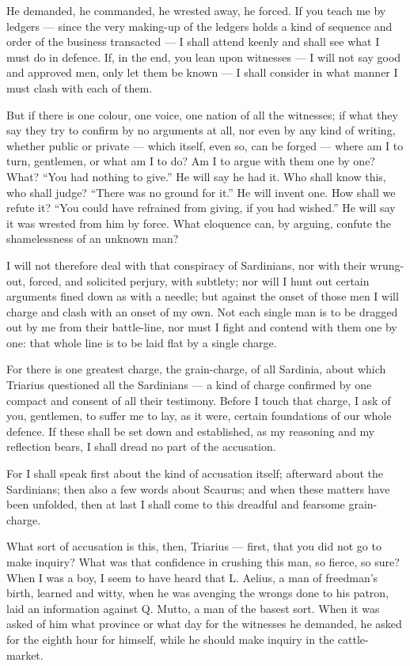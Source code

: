  He demanded, he commanded, he wrested away, he forced. If you teach me by ledgers --- since the very making-up of the ledgers holds a kind of sequence and order of the business transacted --- I shall attend keenly and shall see what I must do in defence. If, in the end, you lean upon witnesses --- I will not say good and approved men, only let them be known --- I shall consider in what manner I must clash with each of them.

 But if there is one colour, one voice, one nation of all the witnesses; if what they say they try to confirm by no arguments at all, nor even by any kind of writing, whether public or private --- which itself, even so, can be forged --- where am I to turn, gentlemen, or what am I to do? Am I to argue with them one by one? What? ``You had nothing to give.'' He will say he had it. Who shall know this, who shall judge? ``There was no ground for it.'' He will invent one. How shall we refute it? ``You could have refrained from giving, if you had wished.'' He will say it was wrested from him by force. What eloquence can, by arguing, confute the shamelessness of an unknown man?

 I will not therefore deal with that conspiracy of Sardinians, nor with their wrung-out, forced, and solicited perjury, with subtlety; nor will I hunt out certain arguments fined down as with a needle; but against the onset of those men I will charge and clash with an onset of my own. Not each single man is to be dragged out by me from their battle-line, nor must I fight and contend with them one by one: that whole line is to be laid flat by a single charge.

 For there is one greatest charge, the grain-charge, of all Sardinia, about which Triarius questioned all the Sardinians --- a kind of charge confirmed by one compact and consent of all their testimony. Before I touch that charge, I ask of you, gentlemen, to suffer me to lay, as it were, certain foundations of our whole defence. If these shall be set down and established, as my reasoning and my reflection bears, I shall dread no part of the accusation.

 For I shall speak first about the kind of accusation itself; afterward about the Sardinians; then also a few words about Scaurus; and when these matters have been unfolded, then at last I shall come to this dreadful and fearsome grain-charge.

 What sort of accusation is this, then, Triarius --- first, that you did not go to make inquiry? What was that confidence in crushing this man, so fierce, so sure? When I was a boy, I seem to have heard that L. Aelius, a man of freedman's birth, learned and witty, when he was avenging the wrongs done to his patron, laid an information against Q. Mutto, a man of the basest sort. When it was asked of him what province or what day for the witnesses he demanded, he asked for the eighth hour for himself, while he should make inquiry in the cattle-market.

